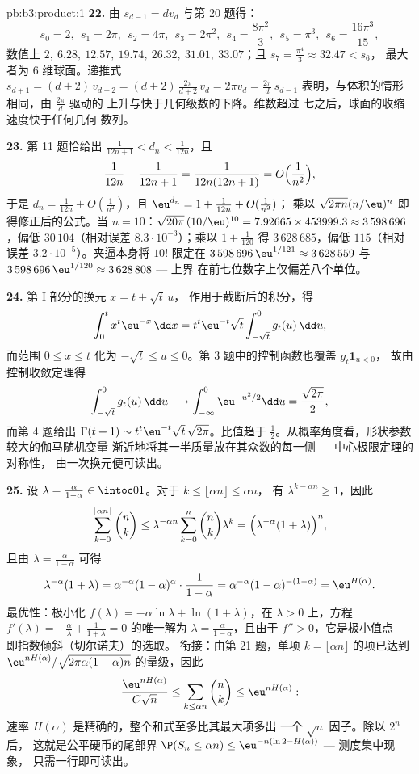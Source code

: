 \begin{solution}{pb:b3:product:1}
\textbf{22.} 由 $s_{d-1} = dv_d$ 与第 20 题得：
\[
s_0 = 2,\ \ s_1 = 2\pi,\ \ s_2 = 4\pi,\ \ s_3 = 2\pi^2,\ \
s_4 = \frac{8\pi^2}3,\ \ s_5 = \pi^3,\ \ s_6 =
\frac{16\pi^3}{15},
\]
数值上 $2,\ 6.28,\ 12.57,\ 19.74,\ 26.32,\ 31.01,\
33.07$；且 $s_7 = \frac{\pi^4}3 \approx 32.47 < s_6$，
最大者为 $6$ 维球面。递推式 $s_{d+1} =
(d+2)\,v_{d+2} = (d+2)\,\frac{2\pi}{d+2}\,v_d = 2\pi v_d =
\frac{2\pi}d\,s_{d-1}$ 表明，与体积的情形相同，由 $\frac{2\pi}d$ 驱动的
上升与快于几何级数的下降。维数超过
七之后，球面的收缩速度快于任何几何
数列。

\textbf{23.} 第 11 题恰给出 $\frac1{12n+1} < d_n <
\frac1{12n}$，且
\[
\frac1{12n} - \frac1{12n+1} = \frac1{12n(12n+1)} =
O\Bigl(\frac1{n^2}\Bigr),
\]
于是 $d_n = \frac1{12n} + O(\frac1{n^2})$，且 $\eu^{d_n} = 1 +
\frac1{12n} + O(\frac1{n^2})$；
乘以 $\sqrt{2\pi n}(n/\eu)^n$ 即得修正后的公式。当 $n =
10$：$\sqrt{20\pi}\,(10/\eu)^{10} = 7.92665 \times 453999.3
\approx 3\,598\,696$，偏低 $30\,104$（相对误差
$8.3\cdot10^{-3}$）；乘以 $1 + \frac1{120}$ 得
$3\,628\,685$，偏低 $115$（相对误差
$3.2\cdot10^{-5}$）。夹逼本身将 $10!$ 限定在
$3\,598\,696\,\eu^{1/121} \approx 3\,628\,559$ 与
$3\,598\,696\,\eu^{1/120} \approx 3\,628\,808$ --- 上界
在前七位数字上仅偏差八个单位。

\textbf{24.} 第 I 部分的换元 $x = t + \sqrt t\,u$，
作用于截断后的积分，得
\[
\int_0^{t} x^{t}\eu^{-x}\,\dd x
= t^{t}\eu^{-t}\sqrt t\int_{-\sqrt t}^{0} g_t(u)\,\dd u ,
\]
而范围 $0 \leq x \leq t$ 化为 $-\sqrt t \leq u \leq
0$。第 3 题中的控制函数也覆盖 $g_t\mathbf 1_{u < 0}$，
故由控制收敛定理得
\[
\int_{-\sqrt t}^{0}g_t(u)\,\dd u \longrightarrow
\int_{-\infty}^{0}\eu^{-u^2/2}\dd u = \frac{\sqrt{2\pi}}2 ,
\]
而第 4 题给出 $\Gamma(t+1) \sim
t^t\eu^{-t}\sqrt t\,\sqrt{2\pi}$。比值趋于
$\frac12$。从概率角度看，形状参数较大的伽马随机变量
渐近地将其一半质量放在其众数的每一侧
--- 中心极限定理的对称性，
由一次换元便可读出。

\textbf{25.} 设 $\lambda = \frac{\alpha}{1-\alpha} \in
\intoc01$。对于 $k \leq \lfloor\alpha n\rfloor \leq \alpha n$，
有 $\lambda^{k - \alpha n} \geq 1$，因此
\[
\sum_{k=0}^{\lfloor\alpha n\rfloor}\binom nk
\leq \lambda^{-\alpha n}\sum_{k=0}^{n}\binom nk\lambda^{k}
= \Bigl(\lambda^{-\alpha}(1 + \lambda)\Bigr)^{n},
\]
且由 $\lambda = \frac\alpha{1-\alpha}$ 可得
\[
\lambda^{-\alpha}(1+\lambda)
= \alpha^{-\alpha}(1-\alpha)^{\alpha}\cdot\frac1{1-\alpha}
= \alpha^{-\alpha}(1-\alpha)^{-(1-\alpha)}
= \eu^{H(\alpha)} .
\]
最优性：极小化 $f(\lambda) = -\alpha\ln\lambda +
\ln(1+\lambda)$，在 $\lambda > 0$ 上，方程 $f'(\lambda)
= -\frac\alpha\lambda + \frac1{1+\lambda} = 0$ 的唯一解为
$\lambda = \frac\alpha{1-\alpha}$，且由于
$f'' > 0$，它是极小值点 --- 即指数倾斜（切尔诺夫）的选取。
衔接：由第 21 题，单项 $k =
\lfloor\alpha n\rfloor$ 的项已达到
$\eu^{nH(\alpha)}/\sqrt{2\pi\alpha(1-\alpha)n}$ 的量级，因此
\[
\frac{\eu^{nH(\alpha)}}{C\sqrt n} \leq
\sum_{k\leq\alpha n}\binom nk \leq \eu^{nH(\alpha)} :
\]
速率 $H(\alpha)$ 是精确的，整个和式至多比其最大项多出
一个 $\sqrt n$ 因子。除以 $2^n$ 后，
这就是公平硬币的尾部界 $\P(S_n \leq \alpha n) \leq
\eu^{-n(\ln2 - H(\alpha))}$ --- 测度集中现象，
只需一行即可读出。
\end{solution}
